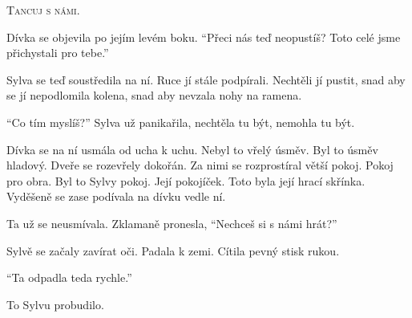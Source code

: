 \documentclass[10pt]{article}
\begin{document}
\begin{spacing}{1}
	\textsc{Tancuj s námi.}\par
	Dívka se objevila po jejím levém boku.
	\enquote{Přeci nás teď neopustíš?
	Toto celé jsme přichystali pro tebe.}\par
	Sylva se teď soustředila na ní.
	Ruce jí stále podpírali.
	Nechtěli jí pustit, snad aby se jí nepodlomila kolena,
	snad aby nevzala nohy na ramena.\par
	\enquote{Co tím myslíš?} Sylva už panikařila,
	nechtěla tu být, nemohla tu být.\par
	Dívka se na ní usmála od ucha k uchu.
	Nebyl to vřelý úsměv.
	Byl to úsměv hladový.
	Dveře se rozevřely dokořán.
	Za nimi se rozprostíral větší pokoj.
	Pokoj pro obra.
	Byl to Sylvy pokoj.
	Její pokojíček.
	Toto byla její hrací skřínka.
	Vyděšeně se zase podívala na dívku vedle ní.\par
	Ta už se neusmívala. Zklamaně pronesla, \enquote{Nechceš si s námi hrát?}\par
	Sylvě se začaly zavírat oči.
	Padala k zemi.
	Cítila pevný stisk rukou.\par
	\vfill
	\enquote{Ta odpadla teda rychle.}\par
	To Sylvu probudilo.

\newpage\fontsize{9pt}{10pt}\selectfont


\end{spacing}
\end{document}

